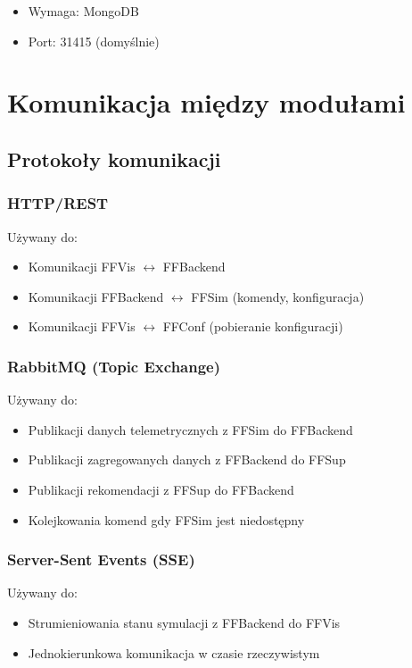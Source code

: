 \begin{itemize}
    \item Wymaga: MongoDB
    \item Port: 31415 (domyślnie)
\end{itemize}

\section{Komunikacja między modułami}

\subsection{Protokoły komunikacji}

\subsubsection{HTTP/REST}

Używany do:
\begin{itemize}
    \item Komunikacji FFVis $\leftrightarrow$ FFBackend
    \item Komunikacji FFBackend $\leftrightarrow$ FFSim (komendy, konfiguracja)
    \item Komunikacji FFVis $\leftrightarrow$ FFConf (pobieranie konfiguracji)
\end{itemize}

\subsubsection{RabbitMQ (Topic Exchange)}

Używany do:
\begin{itemize}
    \item Publikacji danych telemetrycznych z FFSim do FFBackend
    \item Publikacji zagregowanych danych z FFBackend do FFSup
    \item Publikacji rekomendacji z FFSup do FFBackend
    \item Kolejkowania komend gdy FFSim jest niedostępny
\end{itemize}

\subsubsection{Server-Sent Events (SSE)}

Używany do:
\begin{itemize}
    \item Strumieniowania stanu symulacji z FFBackend do FFVis
    \item Jednokierunkowa komunikacja w czasie rzeczywistym
\end{itemize}

